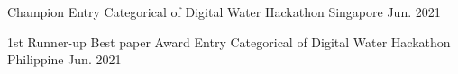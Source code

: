 



\begin{cvhonors}

  \cvhonor
    {Champion} %
    {Entry Categorical of Digital Water Hackathon} %
    {Singapore} %
    {Jun. 2021} %

  \cvhonor
    {1st Runner-up Best paper Award} %
    {Entry Categorical of Digital Water Hackathon} %
    {Philippine} %
    {Jun. 2021} %
\end{cvhonors}




